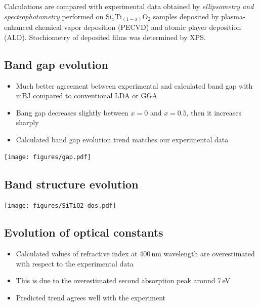 \documentclass[blues]{poster}
\begin{document}
\begin{multicols}{2}
Calculations are compared with experimental data obtained by \emph{ellipsometry and spectrophotometry} performed on Si$_x$Ti$_{(1-x)}$O$_2$ samples deposited by plasma-enhanced chemical vapor deposition (PECVD) and atomic player deposition (ALD). Stochiometry of deposited films was determined by XPS.

\subsection{Band gap evolution}

\begin{minipage}{0.4\linewidth}

\begin{itemize}
\item{Much better agreement between experimental and calculated band gap with mBJ compared to conventional LDA or GGA}
\item{Bang gap decreases slightly between $x = 0$ and $x = 0.5$, then it increases sharply}
\item{Calculated band gap evolution trend matches our experimental data}
\end{itemize}

\end{minipage}
\begin{minipage}{0.6\linewidth}   

\texttt{[image: figures/gap.pdf]}
\end{minipage}


\vspace{-0.5cm}
\subsection{Band structure evolution}
\texttt{[image: figures/SiTiO2-dos.pdf]}

\subsection{Evolution of optical constants}

\begin{minipage}{0.4\linewidth}

\begin{itemize}
\item{Calculated values of refractive index at 400\,nm wavelength are overestimated with respect to the experimental data}
\item{This is due to the overestimated second absorption peak around 7\,eV}
\item{Predicted trend agrees well with the experiment}
\end{itemize}


\end{minipage}
\end{multicols}
\end{document}
